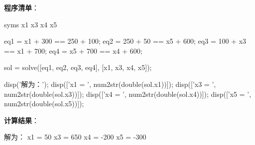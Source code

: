 \documentclass[zihao=-4]{ctexart}
\begin{document}
\begin{enumerate}
\textbf{程序清单}：
\begin{mcode}
	syms x1 x3 x4 x5

eq1 = x1 + 300 == 250 + 100;        %
eq2 = 250 + 50 == x5 + 600;         %
eq3 = 100 + x3 == x1 + 700;         %
eq4 = x5 + 700 == x4 + 600;         %

sol = solve([eq1, eq2, eq3, eq4], [x1, x3, x4, x5]);

disp('解为：');
disp(['x1 = ', num2str(double(sol.x1))]);
disp(['x3 = ', num2str(double(sol.x3))]);
disp(['x4 = ', num2str(double(sol.x4))]);
disp(['x5 = ', num2str(double(sol.x5))]);
\end{mcode}
\textbf{计算结果}：
\begin{mcode}
解为：
x1 = 50
x3 = 650
x4 = -200
x5 = -300
\end{mcode}
\end{enumerate}
\end{document}

